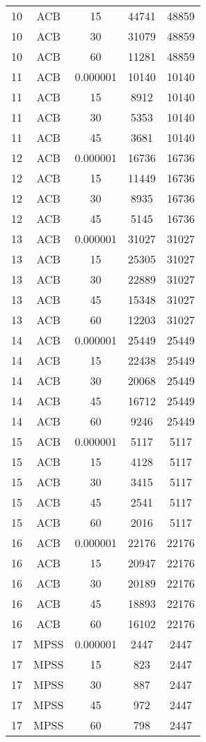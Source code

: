 \begin{center}
\begin{longtable}{ccccc}
10	&	ACB	&	15	&	44741	&	48859	\\
10	&	ACB	&	30	&	31079	&	48859	\\
10	&	ACB	&	60	&	11281	&	48859	\\
11	&	ACB	&	0.000001	&	10140	&	10140	\\
11	&	ACB	&	15	&	8912	&	10140	\\
11	&	ACB	&	30	&	5353	&	10140	\\
11	&	ACB	&	45	&	3681	&	10140	\\
12	&	ACB	&	0.000001	&	16736	&	16736	\\
12	&	ACB	&	15	&	11449	&	16736	\\
12	&	ACB	&	30	&	8935	&	16736	\\
12	&	ACB	&	45	&	5145	&	16736	\\
13	&	ACB	&	0.000001	&	31027	&	31027	\\
13	&	ACB	&	15	&	25305	&	31027	\\
13	&	ACB	&	30	&	22889	&	31027	\\
13	&	ACB	&	45	&	15348	&	31027	\\
13	&	ACB	&	60	&	12203	&	31027	\\
14	&	ACB	&	0.000001	&	25449	&	25449	\\
14	&	ACB	&	15	&	22438	&	25449	\\
14	&	ACB	&	30	&	20068	&	25449	\\
14	&	ACB	&	45	&	16712	&	25449	\\
14	&	ACB	&	60	&	9246	&	25449	\\
15	&	ACB	&	0.000001	&	5117	&	5117	\\
15	&	ACB	&	15	&	4128	&	5117	\\
15	&	ACB	&	30	&	3415	&	5117	\\
15	&	ACB	&	45	&	2541	&	5117	\\
15	&	ACB	&	60	&	2016	&	5117	\\
16	&	ACB	&	0.000001	&	22176	&	22176	\\
16	&	ACB	&	15	&	20947	&	22176	\\
16	&	ACB	&	30	&	20189	&	22176	\\
16	&	ACB	&	45	&	18893	&	22176	\\
16	&	ACB	&	60	&	16102	&	22176	\\
17	&	MPSS	&	0.000001	&	2447	&	2447	\\
17	&	MPSS	&	15	&	823	&	2447	\\
17	&	MPSS	&	30	&	887	&	2447	\\
17	&	MPSS	&	45	&	972	&	2447	\\
17	&	MPSS	&	60	&	798	&	2447	\\

\end{longtable}
\end{center}
